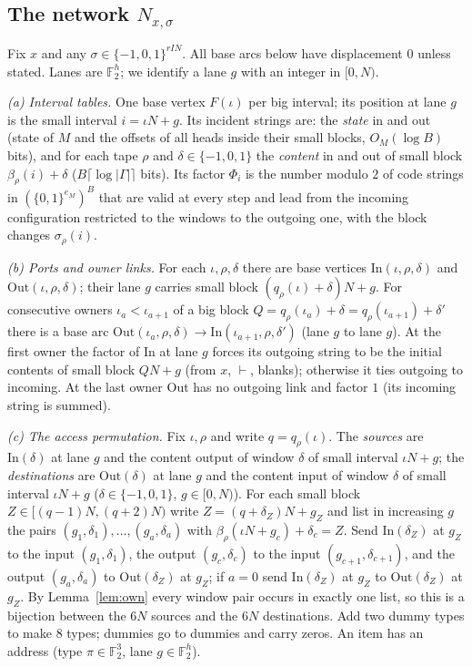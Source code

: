\documentclass[11pt]{article}
\theoremstyle{definition}
\theoremstyle{remark}
\newcommand{\F}{\mathbb F}
\begin{document}
\subsection{The network $N_{x,\sigma}$}\label{subsec:network}
Fix $x$ and any $\sigma\in\{-1,0,1\}^{rIN}$. All base arcs below have displacement $0$ unless stated. Lanes are $\F_2^h$; we
identify a lane $g$ with an integer in $[0,N)$.

\emph{(a) Interval tables.} One base vertex $F(\iota)$ per big interval; its position at lane $g$ is the small interval
$i=\iota N+g$. Its incident strings are: the \emph{state} in and out (state of $M$ and the offsets of all heads inside their
small blocks, $O_M(\log B)$ bits), and for each tape $\rho$ and $\delta\in\{-1,0,1\}$ the \emph{content} in and out of small block
$\beta_\rho(i)+\delta$ ($B\lceil\log|\Gamma|\rceil$ bits). Its factor $\Phi_i$ is the number modulo $2$ of code strings in
$(\{0,1\}^{e_M})^B$ that are valid at every step and lead from the incoming configuration restricted to the windows to the
outgoing one, with the block changes $\sigma_\rho(i)$.

\emph{(b) Ports and owner links.} For each $\iota,\rho,\delta$ there are base vertices $\mathrm{In}(\iota,\rho,\delta)$ and
$\mathrm{Out}(\iota,\rho,\delta)$; their lane $g$ carries small block $(q_\rho(\iota)+\delta)N+g$. For consecutive owners
$\iota_a<\iota_{a+1}$ of a big block $Q=q_\rho(\iota_a)+\delta=q_\rho(\iota_{a+1})+\delta'$ there is a base arc
$\mathrm{Out}(\iota_a,\rho,\delta)\to\mathrm{In}(\iota_{a+1},\rho,\delta')$ (lane $g$ to lane $g$). At the first owner the
factor of $\mathrm{In}$ at lane $g$ forces its outgoing string to be the initial contents of small block $QN+g$ (from $x$,
$\vdash$, blanks); otherwise it ties outgoing to incoming. At the last owner $\mathrm{Out}$ has no outgoing link and factor $1$
(its incoming string is summed).

\emph{(c) The access permutation.} Fix $\iota,\rho$ and write $q=q_\rho(\iota)$. The \emph{sources} are $\mathrm{In}(\delta)$ at
lane $g$ and the content output of window $\delta$ of small interval $\iota N+g$; the \emph{destinations} are
$\mathrm{Out}(\delta)$ at lane $g$ and the content input of window $\delta$ of small interval $\iota N+g$
($\delta\in\{-1,0,1\}$, $g\in[0,N)$). For each small block $Z\in[(q-1)N,(q+2)N)$ write $Z=(q+\delta_Z)N+g_Z$ and list in
increasing $g$ the pairs $(g_1,\delta_1),\dots,(g_a,\delta_a)$ with $\beta_\rho(\iota N+g_c)+\delta_c=Z$. Send
$\mathrm{In}(\delta_Z)$ at $g_Z$ to the input $(g_1,\delta_1)$, the output $(g_c,\delta_c)$ to the input $(g_{c+1},\delta_{c+1})$,
and the output $(g_a,\delta_a)$ to $\mathrm{Out}(\delta_Z)$ at $g_Z$; if $a=0$ send $\mathrm{In}(\delta_Z)$ at $g_Z$ to
$\mathrm{Out}(\delta_Z)$ at $g_Z$. By Lemma~\ref{lem:own} every window pair occurs in exactly one list, so this is a bijection
between the $6N$ sources and the $6N$ destinations. Add two dummy types to make $8$ types; dummies go to dummies and carry zeros.
An item has an address (type $\pi\in\F_2^3$, lane $g\in\F_2^h$).
\end{document}
